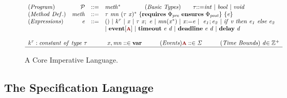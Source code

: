 \documentclass[acmsmall,10pt,review]{acmart}
\newcommand{\effect}{\textcolor{black}{\ensuremath{\mathrm{\Phi}}}}
\newcommand{\anyevent}[1]{{\textcolor{darkred}
{{\textbf{\footnotesize #1}}}}}
\newcommand{\code}[1]{{\tt{\ensuremath{\m{#1}}}}}
\newcommand{\m}{\mathit}
\begin{document}
{{
\begin{figure}[!ht]
\renewcommand{\arraystretch}{1.1}
\centering%
  $
  \begin{array}{lrcl}

    \m{(Program)} &  \code{\mathcal{P} }&\code{  ::= }&
    \code{%
   {meth^*}} 
\qquad   \qquad
    \m{(Basic\ Types)} \qquad  \code{\tau} \code{  ::= }
     \code{int\ |\ bool\ |\ void}
    \\
    

  \m{(Method\ Def.)} &  \code{meth}&\code{  ::= }&
  \code{\tau \ mn  \ {( \tau\ x)^*}\ \{\textbf{requires}\ \effect_{pre}\ \textbf{ensures}\  \effect_{post}\} \ \{ e \}}
  \\
  \m{(Expressions)} &  \code{e}&\code{  ::= }&
    \code{ ()\ |\ k^\tau\ |\ x\ |\ 
    \tau\ x;\ e \ |\ mn({x^*}) \ }
  \code{|\ x{:=}e\ |\ 
 \ e_1;e_2\ 
  |\ {if}\ v\ {then}\ e_1\ {else}\ e_2 
 }  \\
 &   & & \code{
| \ \textbf{event} [\anyevent{A}]\
  | \ \textbf{timeout} \ e \ d \  
  | \ \textbf{deadline} \ e \ d \  
  | \ \textbf{delay}\ d 
  }  \\
  ~\\
 
 
    \multicolumn{4}{c}{
  \code{k^\tau:constant\ of\ type\ \tau\ } 
  \qquad\quad
\code{    x, mn  ::\in \textbf{var}}  
\qquad\quad
 \code{(Events)  \anyevent{A} ::\in \Sigma 
\qquad\quad
\m{(Time\ Bounds)}\ \code{d} \code{\in \mathbb{Z^+}}    
}   
    }\\  
    \hline
  \end{array}  
  $
 \caption{A Core Imperative Language.} 
 \label{fig:code_language}
  \vspace{-1mm}
\end{figure}
}



%


\subsection{The Specification Language}
\label{subsec:Specification_language}

}
\end{document}
